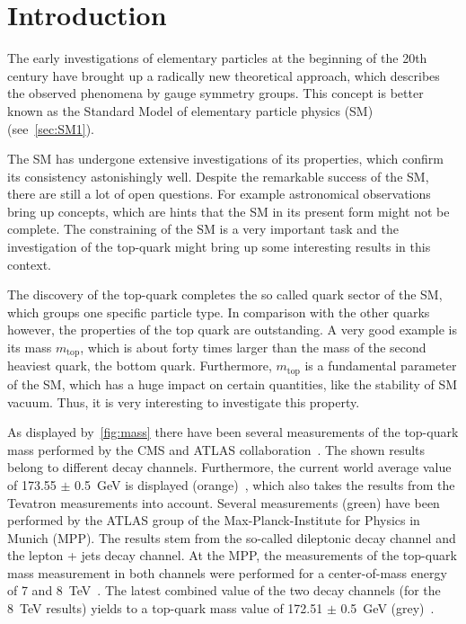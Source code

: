 \chapter{Introduction}

\label{sec:intro}

The early investigations of elementary particles at the beginning of the 20th century have brought up a radically new theoretical approach, which describes the observed phenomena by gauge symmetry groups. This concept is better known as the Standard Model of elementary particle physics (SM) (see~\cref{sec:SM1}).

The SM has undergone extensive investigations of its properties, which confirm its consistency astonishingly well. Despite the remarkable success of the SM, there are still a lot of open questions. For example astronomical observations  bring up concepts, which are hints that the SM in its present form might not be complete. The constraining of the SM  is a very important task and the investigation of the top-quark might bring up some interesting results in this context. 

The discovery of the top-quark completes the so called quark sector of the SM, which groups one specific particle type. In comparison with the other quarks however, the properties of the top quark are outstanding. A very good example  is its mass $m_{\text{top}}$, which is about forty times larger than the mass of the second heaviest quark, the bottom quark. Furthermore, $m_{\text{top}}$ is a fundamental parameter of the SM, which has a huge impact on certain quantities, like the stability of SM vacuum.  Thus, it is very interesting to investigate this property.

As displayed by~\cref{fig:mass} there have been several measurements of the top-quark mass performed by the CMS and ATLAS collaboration~\cite{PubR}. The shown results belong to different decay channels. Furthermore, the current world average value of 173.55 $\pm$ 0.5~GeV is displayed (orange)~\cite{ATLAS:2014wva}, which also takes the results from the Tevatron measurements into account. Several measurements (green) have been performed by the ATLAS group of the Max-Planck-Institute for Physics in Munich (MPP). The results stem from the so-called dileptonic decay channel and the lepton + jets decay channel. At the MPP, the measurements of the top-quark mass measurement in both channels were performed for a center-of-mass energy of 7 and 8~TeV~\cite{Aad:2015nba,Aaboud:2016igd,ATLAS-CONF-2017-071}. The latest combined value of the two decay channels  (for the  8~TeV results) yields to a top-quark mass value of 172.51 $\pm$ 0.5~GeV (grey)~\cite{ATLAS-CONF-2017-071}.

